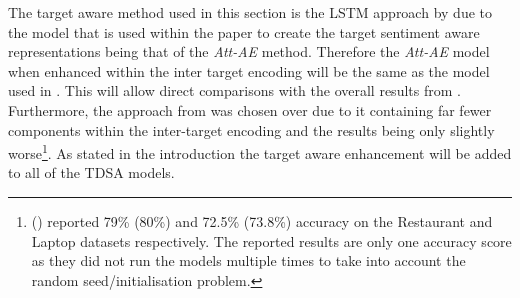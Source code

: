 The target aware method used in this section is the LSTM approach by \citet{hazarika-etal-2018-modeling} due to the model that is used within the paper to create the target sentiment aware representations being that of the \textit{Att-AE} method. Therefore the \textit{Att-AE} model when enhanced within the inter target encoding will be the same as the model used in \citet{hazarika-etal-2018-modeling}. This will allow direct comparisons with the overall results from \citet{hazarika-etal-2018-modeling}. Furthermore, the approach from \citet{hazarika-etal-2018-modeling} was chosen over \citet{majumder-etal-2018-iarm} due to it containing far fewer components within the inter-target encoding and the results being only slightly worse\footnote{\citet{hazarika-etal-2018-modeling} (\citet{majumder-etal-2018-iarm}) reported 79\% (80\%) and 72.5\% (73.8\%) accuracy on the Restaurant and Laptop datasets respectively. The reported results are only one accuracy score as they did not run the models multiple times to take into account the random seed/initialisation problem.}. As stated in the introduction the target aware enhancement will be added to all of the TDSA models.



